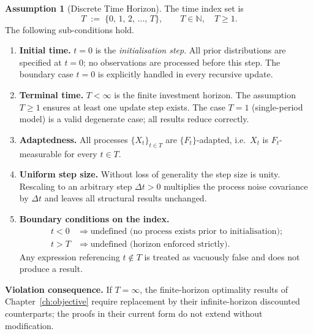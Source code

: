 \documentclass[12pt,openany]{book}
\newcommand{\calF}{\mathcal{F}}
\numberwithin{equation}{chapter}
\theoremstyle{plain}
\theoremstyle{definition}
\newtheorem{assumption}[theorem]{Assumption}
\theoremstyle{remark}
\def\mathcal#1{#1}%
\begin{document}
\begin{assumption}[Discrete Time Horizon]
\label{asm:time}
The time index set is
\begin{equation}
  \mathcal{T} \;:=\; \{0,\,1,\,2,\,\ldots,\,T\},
  \qquad T \in \mathbb{N},\quad T \geq 1.
  \label{eq:time-set}
\end{equation}
The following sub-conditions hold.

\begin{enumerate}[label=\textbf{A2.\arabic*.}, leftmargin=*, widest=A2.5.]
  \item \textbf{Initial time.}
        $t = 0$ is the \emph{initialisation step}.  All prior
        distributions are specified at $t = 0$; no observations
        are processed before this step.  The boundary case
        $t = 0$ is explicitly handled in every recursive update.

  \item \textbf{Terminal time.}
        $T < \infty$ is the finite investment horizon.  The
        assumption $T \geq 1$ ensures at least one update step
        exists.  The case $T = 1$ (single-period model) is a
        valid degenerate case; all results reduce correctly.

  \item \textbf{Adaptedness.}
        All processes $\{X_t\}_{t \in \mathcal{T}}$ are
        $\{\calF_t\}$-adapted, i.e.\
        $X_t$ is $\calF_t$-measurable for every
        $t \in \mathcal{T}$.

  \item \textbf{Uniform step size.}
        Without loss of generality the step size is unity.
        Rescaling to an arbitrary step $\Delta t > 0$
        multiplies the process noise covariance by $\Delta t$
        and leaves all structural results unchanged.

  \item \textbf{Boundary conditions on the index.}
        \begin{align}
          t < 0 &\;\Rightarrow\; \text{undefined (no process
            exists prior to initialisation);} \label{eq:t-lb}\\
          t > T &\;\Rightarrow\; \text{undefined (horizon
            enforced strictly).} \label{eq:t-ub}
        \end{align}
        Any expression referencing $t \notin \mathcal{T}$ is
        treated as vacuously false and does not produce a
        result.
\end{enumerate}

\noindent\textbf{Violation consequence.}  If $T = \infty$, the
finite-horizon optimality results of
Chapter~\ref{ch:objective} require replacement by
their infinite-horizon discounted counterparts; the proofs in
their current form do not extend without modification.
\end{assumption}
\end{document}
